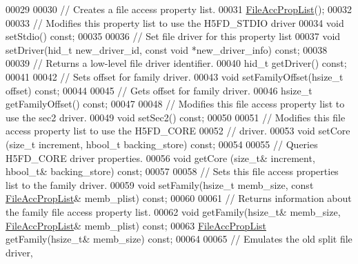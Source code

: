 \begin{DoxyCode}
00029 
00030         \textcolor{comment}{// Creates a file access property list.}
00031         \hyperlink{class_h5_1_1_file_acc_prop_list}{FileAccPropList}();
00032 
00033         \textcolor{comment}{// Modifies this property list to use the H5FD\_STDIO driver}
00034         \textcolor{keywordtype}{void} setStdio() \textcolor{keyword}{const};
00035 
00036         \textcolor{comment}{// Set file driver for this property list}
00037         \textcolor{keywordtype}{void} setDriver(hid\_t new\_driver\_id, \textcolor{keyword}{const} \textcolor{keywordtype}{void} *new\_driver\_info) \textcolor{keyword}{const};
00038 
00039         \textcolor{comment}{// Returns a low-level file driver identifier.}
00040         hid\_t getDriver() \textcolor{keyword}{const};
00041 
00042         \textcolor{comment}{// Sets offset for family driver.}
00043         \textcolor{keywordtype}{void} setFamilyOffset(hsize\_t offset) \textcolor{keyword}{const};
00044 
00045         \textcolor{comment}{// Gets offset for family driver.}
00046         hsize\_t getFamilyOffset() \textcolor{keyword}{const};
00047 
00048         \textcolor{comment}{// Modifies this file access property list to use the sec2 driver.}
00049         \textcolor{keywordtype}{void} setSec2() \textcolor{keyword}{const};
00050 
00051         \textcolor{comment}{// Modifies this file access property list to use the H5FD\_CORE}
00052         \textcolor{comment}{// driver.}
00053         \textcolor{keywordtype}{void} setCore (\textcolor{keywordtype}{size\_t} increment, hbool\_t backing\_store) \textcolor{keyword}{const};
00054 
00055         \textcolor{comment}{// Queries H5FD\_CORE driver properties.}
00056         \textcolor{keywordtype}{void} getCore (\textcolor{keywordtype}{size\_t}& increment, hbool\_t& backing\_store) \textcolor{keyword}{const};
00057 
00058         \textcolor{comment}{// Sets this file access properties list to the family driver.}
00059         \textcolor{keywordtype}{void} setFamily(hsize\_t memb\_size, \textcolor{keyword}{const} \hyperlink{class_h5_1_1_file_acc_prop_list}{FileAccPropList}& memb\_plist) \textcolor{keyword}{const};
00060 
00061         \textcolor{comment}{// Returns information about the family file access property list.}
00062         \textcolor{keywordtype}{void} getFamily(hsize\_t& memb\_size, \hyperlink{class_h5_1_1_file_acc_prop_list}{FileAccPropList}& memb\_plist) \textcolor{keyword}{const};
00063         \hyperlink{class_h5_1_1_file_acc_prop_list}{FileAccPropList} getFamily(hsize\_t& memb\_size) \textcolor{keyword}{const};
00064 
00065         \textcolor{comment}{// Emulates the old split file driver,}

\end{DoxyCode}
